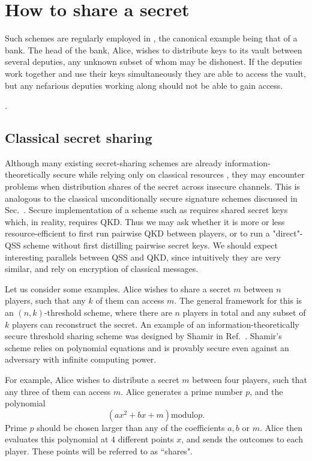 \section{How to share a secret}\label{sec:qss_lit_review}
Such schemes are regularly employed in , the canonical example being that of a bank. The head of the bank, Alice, wishes to distribute keys to its vault between several deputies, any unknown subset of whom may be dishonest. If the deputies work together and use their keys simultaneously they are able to access the vault, but any nefarious deputies working along should not be able to gain access.

.


\subsection*{Classical secret sharing}
Although many existing secret-sharing schemes are already information-theoretically secure while relying only on classical resources , they may encounter problems when distribution shares of the secret across insecure channels.  This is analogous to the classical unconditionally secure signature schemes discussed in Sec.~. Secure implementation of a scheme such as  requires shared secret keys which, in reality, requires QKD. Thus we may ask whether it is more or less resource-efficient to first run pairwise QKD between players, or to run a "direct"-QSS scheme without first distilling pairwise secret keys. We should expect interesting parallels between QSS and QKD, since intuitively they are very similar, and rely on encryption of classical messages.

Let us consider some examples. Alice wishes to share a secret $m$ between $n$ players, such that any $k$ of them can access $m$. The general framework for this is an $\left(n, k\right)$-threshold scheme, where there are $n$ players in total and any subset of $k$ players can reconstruct the secret. An example of an information-theoretically secure threshold sharing scheme was designed by Shamir in Ref.~. Shamir's scheme relies on polynomial equations and is provably secure even against an adversary with infinite computing power. 

For example, Alice wishes to distribute a secret $m$ between four players, such that any three of them can access $m$. Alice generates a prime number $p$, and the polynomial 
\begin{equation}
\left( a x^2 + b x + m \right) \text{modulo} p.
\end{equation}
Prime $p$ should be chosen larger than any of the coefficients $a, b$ or $m$. Alice then evaluates this polynomial at $4$ different points $x$, and sends the outcomes to each player. These points will be referred to as ``shares".

